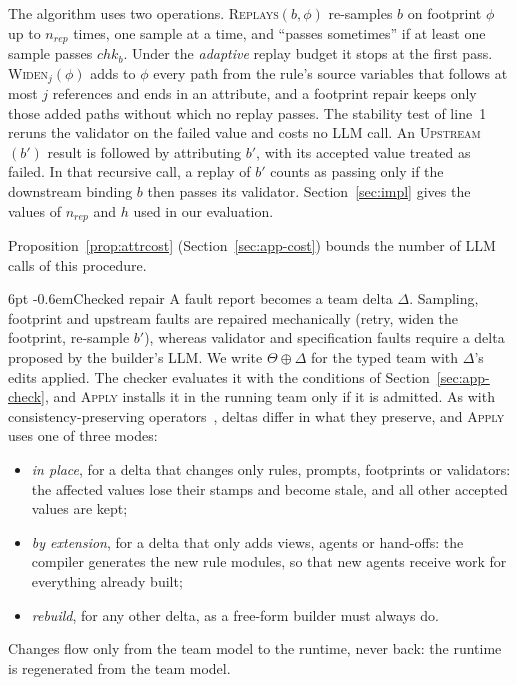\documentclass[pdflatex,sn-mathphys-num]{sn-jnl}
\makeatletter
\theoremstyle{thmstyleone}%
\theoremstyle{thmstyletwo}%
\theoremstyle{thmstylethree}%
\newcommand{\Team}{\Theta}
\newcommand{\chk}{\mathit{chk}}
\renewcommand\paragraph{\@startsection{paragraph}{4}{\z@}%
  {6pt \@plus 2pt \@minus 1pt}{-0.6em}{\normalfont\normalsize\bfseries}}
\makeatother
\begin{document}
The algorithm uses two operations. \textsc{Replays}$(b,\phi)$ re-samples $b$ on
footprint $\phi$ up to $n_{\mathit{rep}}$ times, one sample at a time, and
``passes sometimes'' if at least one sample passes $\chk_b$. Under the
\emph{adaptive} replay budget it stops at the first pass.
\textsc{Widen}$_j(\phi)$ adds to $\phi$ every path from the rule's source
variables that follows at most $j$ references and ends in an attribute, and a
footprint repair keeps only those added paths without which no replay passes.
The stability test of line~1 reruns the validator on the failed value and costs
no LLM call. An \textsc{Upstream}$(b')$ result is followed by attributing $b'$,
with its accepted value treated as failed. In that recursive call, a replay of
$b'$ counts as passing only if the downstream binding $b$ then passes its
validator. Section~\ref{sec:impl} gives the values of $n_{\mathit{rep}}$ and
$h$ used in our evaluation.

Proposition~\ref{prop:attrcost} (Section~\ref{sec:app-cost}) bounds the number of LLM calls
of this procedure.

\paragraph{Checked repair} A fault report becomes a team delta $\Delta$.
Sampling, footprint and upstream faults are repaired mechanically (retry, widen
the footprint, re-sample $b'$), whereas validator and specification faults
require a delta proposed by the builder's LLM. We write $\Team\oplus\Delta$ for
the typed team with $\Delta$'s edits applied. The checker evaluates it with
the conditions of Section~\ref{sec:app-check}, and \textsc{Apply} installs it in the running team
only if it is admitted. As with consistency-preserving
operators~\cite{horcas2023consistency,alomar2021preserving}, deltas differ in
what they preserve, and \textsc{Apply} uses one of three modes:
\begin{itemize}[leftmargin=1.3em, itemsep=1pt, topsep=2pt]
\item \emph{in place}, for a delta that changes only rules, prompts, footprints
or validators: the affected values lose their stamps and become stale, and all
other accepted values are kept;
\item \emph{by extension}, for a delta that only adds views, agents or
hand-offs: the compiler generates the new rule modules, so that new agents
receive work for everything already built;
\item \emph{rebuild}, for any other delta, as a free-form builder must always do.
\end{itemize}
Changes flow only from the team model to the runtime, never back: the runtime
is regenerated from the team model.
\end{document}
